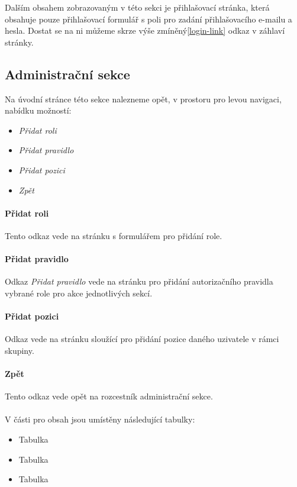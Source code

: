 \documentclass[11pt,oneside]{fithesis}
\begin{document}
            Dalším obsahem zobrazovaným v této sekci je přihlašovací stránka, která obsahuje pouze přihlašovací formulář s poli pro zadání přihlašovacího e-mailu a hesla. Dostat se na ni můžeme skrze výše zmíněný\ref{login-link} odkaz v záhlaví stránky.
            
            \subsection*{Administrační sekce}
            Na úvodní stránce této sekce nalezneme opět, v prostoru pro levou navigaci, nabídku možností:
            \begin{itemize}
                \item \textit{Přidat roli}
                \item \textit{Přidat pravidlo}
                \item \textit{Přidat pozici}
                \item \textit{Zpět}
            \end{itemize}

            \paragraph*{Přidat roli} 
            Tento odkaz vede na stránku s formulářem pro přidání role.

            \paragraph*{Přidat pravidlo} 
            Odkaz \textit{Přidat pravidlo} vede na stránku pro přidání autorizačního pravidla vybrané role pro akce jednotlivých sekcí.

            \paragraph*{Přidat pozici} 
            Odkaz vede na stránku sloužící pro přidání pozice daného uzivatele v rámci skupiny.

            \paragraph*{Zpět} 
            Tento odkaz vede opět na rozcestník administrační sekce.
            
            \paragraph*{}
            V části pro obsah jsou umístěny následující tabulky:
            \begin{itemize}
                \item Tabulka 
                \item Tabulka 
                \item Tabulka 
            \end{itemize}
\end{document}
